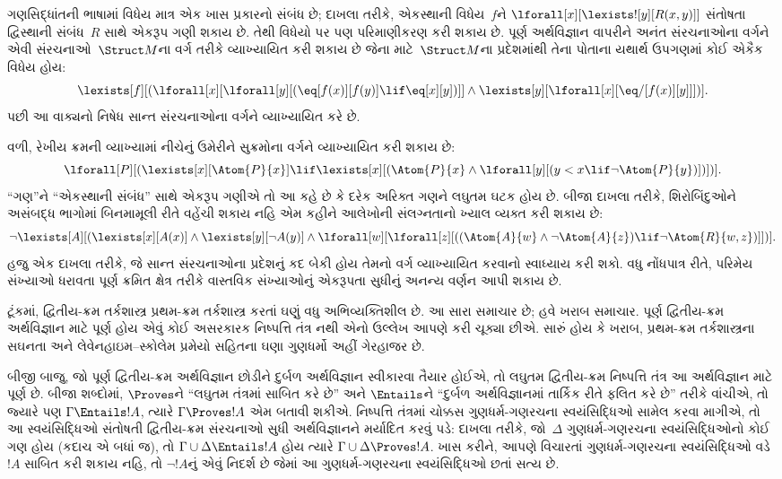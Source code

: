 ગણસિદ્ધાંતની ભાષામાં વિધેય માત્ર એક ખાસ પ્રકારનો સંબંધ છે; દાખલા
તરીકે, એકસ્થાની વિધેય~$f$ને
$\lforall[x][\lexists![y][R(x,y)]]$ સંતોષતા દ્વિસ્થાની સંબંધ~$R$ સાથે
એકરૂપ ગણી શકાય છે. તેથી વિધેયો પર પણ પરિમાણીકરણ કરી શકાય છે. પૂર્ણ
અર્થવિજ્ઞાન વાપરીને અનંત સંરચનાઓના વર્ગને એવી
સંરચનાઓ~$\Struct M$ના વર્ગ તરીકે વ્યાખ્યાયિત કરી શકાય છે જેના
માટે~$\Struct M$ના પ્રદેશમાંથી તેના પોતાના યથાર્થ ઉપગણમાં કોઈ
એકૈક વિધેય હોય:
\[
\lexists[f][(\lforall[x][\lforall[y][(\eq[f(x)][f(y)] \lif \eq[x][y])]]
  \land \lexists[y][\lforall[x][\eq/[f(x)][y]]])].
\]
પછી આ વાક્યનો નિષેધ સાન્ત સંરચનાઓના વર્ગને વ્યાખ્યાયિત કરે છે.

વળી, રેખીય ક્રમની વ્યાખ્યામાં નીચેનું ઉમેરીને સુક્રમોના વર્ગને
વ્યાખ્યાયિત કરી શકાય છે:
\[
\lforall[P][(\lexists[x][\Atom{P}{x}] \lif \lexists[x][(\Atom{P}{x}
    \land \lforall[y][(y < x \lif \lnot \Atom{P}{y})])])].
\]
``ગણ''ને ``એકસ્થાની સંબંધ'' સાથે એકરૂપ ગણીએ તો આ કહે છે કે દરેક
અરિક્ત ગણને લઘુતમ ઘટક હોય છે. બીજા દાખલા તરીકે, શિરોબિંદુઓને
અસંબદ્ધ ભાગોમાં બિનમામૂલી રીતે વહેંચી શકાય નહિ એમ કહીને આલેખોની
સંલગ્નતાનો ખ્યાલ વ્યક્ત કરી શકાય છે:
\[
\lnot \lexists[A][(\lexists[x][A(x)] \land \lexists[y][\lnot A(y)]
  \land \lforall[w][\lforall[z][((\Atom{A}{w} \land \lnot \Atom{A}{z})
      \lif \lnot \Atom{R}{w,z})]])].
\]
હજુ એક દાખલા તરીકે, જે સાન્ત સંરચનાઓના પ્રદેશનું કદ બેકી
હોય તેમનો વર્ગ વ્યાખ્યાયિત કરવાનો સ્વાધ્યાય કરી શકો. વધુ નોંધપાત્ર રીતે,
પરિમેય સંખ્યાઓ ધરાવતા પૂર્ણ ક્રમિત ક્ષેત્ર તરીકે વાસ્તવિક સંખ્યાઓનું
એકરૂપતા સુધીનું અનન્ય વર્ણન આપી શકાય છે.

ટૂંકમાં, દ્વિતીય-ક્રમ તર્કશાસ્ત્ર પ્રથમ-ક્રમ તર્કશાસ્ત્ર કરતાં ઘણું વધુ
અભિવ્યક્તિશીલ છે. આ સારા સમાચાર છે; હવે ખરાબ સમાચાર. પૂર્ણ દ્વિતીય-ક્રમ
અર્થવિજ્ઞાન માટે પૂર્ણ હોય એવું કોઈ અસરકારક નિષ્પત્તિ તંત્ર નથી
એનો ઉલ્લેખ આપણે કરી ચૂક્યા છીએ. સારું હોય કે ખરાબ, પ્રથમ-ક્રમ
તર્કશાસ્ત્રના સઘનતા અને લેવેનહાઇમ--સ્કોલેમ પ્રમેયો સહિતના ઘણા ગુણધર્મો
અહીં ગેરહાજર છે.

બીજી બાજુ, જો પૂર્ણ દ્વિતીય-ક્રમ અર્થવિજ્ઞાન છોડીને દુર્બળ અર્થવિજ્ઞાન
સ્વીકારવા તૈયાર હોઈએ, તો લઘુતમ દ્વિતીય-ક્રમ નિષ્પત્તિ તંત્ર આ
અર્થવિજ્ઞાન માટે પૂર્ણ છે. બીજા શબ્દોમાં, $\Proves$ને ``લઘુતમ તંત્રમાં
સાબિત કરે છે'' અને $\Entails$ને ``દુર્બળ અર્થવિજ્ઞાનમાં તાર્કિક રીતે
ફલિત કરે છે'' તરીકે વાંચીએ, તો જ્યારે પણ $\Gamma \Entails !A$, ત્યારે
$\Gamma \Proves !A$ એમ બતાવી શકીએ. નિષ્પત્તિ તંત્રમાં ચોક્કસ
ગુણધર્મ-ગણરચના સ્વયંસિદ્ધિઓ સામેલ કરવા માગીએ, તો આ સ્વયંસિદ્ધિઓ
સંતોષતી દ્વિતીય-ક્રમ સંરચનાઓ સુધી અર્થવિજ્ઞાનને મર્યાદિત કરવું પડે:
દાખલા તરીકે, જો~$\Delta$ ગુણધર્મ-ગણરચના સ્વયંસિદ્ધિઓનો કોઈ ગણ હોય
(કદાચ એ બધાં જ), તો $\Gamma \cup \Delta \Entails !A$ હોય ત્યારે
$\Gamma \cup \Delta \Proves !A$. ખાસ કરીને, આપણે વિચારતાં
ગુણધર્મ-ગણરચના સ્વયંસિદ્ધિઓ વડે~$!A$ સાબિત કરી શકાય નહિ, તો
$\lnot !A$નું એવું નિદર્શ છે જેમાં આ ગુણધર્મ-ગણરચના સ્વયંસિદ્ધિઓ છતાં
સત્ય છે.

